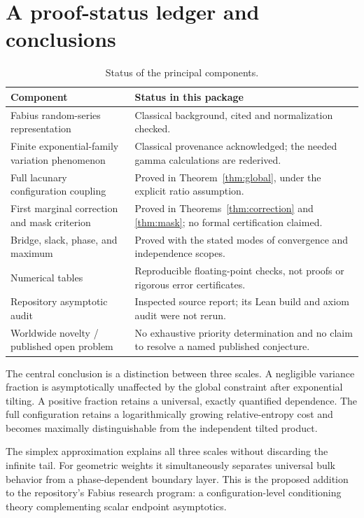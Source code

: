 \documentclass[11pt,letterpaper]{article}
\numberwithin{equation}{section}
\theoremstyle{definition}
\theoremstyle{remark}
\begin{document}
\section{A proof-status ledger and conclusions}
\label{sec:status}

\begin{table}[htbp]
\centering
\small
\caption{Status of the principal components.}
\begin{tabular}{>{\raggedright\arraybackslash}p{.32\linewidth}>{\raggedright\arraybackslash}p{.59\linewidth}}
\toprule
Component & Status in this package\\
\midrule
Fabius random-series representation & Classical background, cited and normalization checked.\\
Finite exponential-family variation phenomenon & Classical provenance acknowledged; the needed gamma calculations are rederived.\\
Full lacunary configuration coupling & Proved in Theorem~\ref{thm:global}, under the explicit ratio assumption.\\
First marginal correction and mask criterion & Proved in Theorems~\ref{thm:correction} and \ref{thm:mask}; no formal certification claimed.\\
Bridge, slack, phase, and maximum & Proved with the stated modes of convergence and independence scopes.\\
Numerical tables & Reproducible floating-point checks, not proofs or rigorous error certificates.\\
Repository asymptotic audit & Inspected source report; its Lean build and axiom audit were not rerun.\\
Worldwide novelty / published open problem & No exhaustive priority determination and no claim to resolve a named published conjecture.\\
\bottomrule
\end{tabular}
\end{table}

The central conclusion is a distinction between three scales. A negligible
variance fraction is asymptotically unaffected by the global constraint after
exponential tilting. A positive fraction retains a universal, exactly
quantified dependence. The full configuration retains a logarithmically
growing relative-entropy cost and becomes maximally distinguishable from
the independent tilted product.

The simplex approximation explains all three scales without discarding the
infinite tail. For geometric weights it simultaneously separates universal
bulk behavior from a phase-dependent boundary layer. This is the proposed
addition to the repository's Fabius research program: a configuration-level
conditioning theory complementing scalar endpoint asymptotics.
\end{document}
